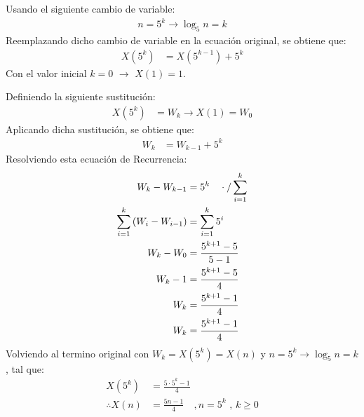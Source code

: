 \begin{solution}
Usando el siguiente cambio de variable:
\begin{align*}
    n=5^k \xrightarrow{} \log_5 n=k
\end{align*}
Reemplazando dicho cambio de variable en la ecuación original, se obtiene que:
\begin{align*}
    X(5^k) &= X(5^{k-1}) + 5^k
\end{align*}
Con el valor inicial $k=0$ $\rightarrow$ $X(1)=1$.

Definiendo la siguiente sustitución:
\begin{align*}
    X(5^k)&=W_k \rightarrow X(1)=W_0
\end{align*}
Aplicando dicha sustitución, se obtiene que:
\begin{align*}
    W_k &= W_{k-1} + 5^k
\end{align*}
Resolviendo esta ecuación de Recurrencia:
\begin{align*}
    W_k - W_{k-1} &= 5^k \quad \cdot \text{/} \sum\limits_{i=1}^{k}\\
    \sum\limits_{i=1}^{k}\left(W_i - W_{i-1} \right) &= \sum\limits_{i=1}^{k}5^i\\
    W_k - W_0 &= \frac{5^{k+1} -5}{5-1}\\
    W_k - 1 &= \frac{5^{k+1} -5}{4}\\
    W_k &= \frac{5^{k+1}-1}{4}\\
    W_k &= \frac{5^{k+1}-1}{4}
\end{align*}
Volviendo al termino original con $W_k = X(5^k) = X(n)$ y $n=5^k \rightarrow \log_5 n = k$, tal que:
\begin{align*}
    X(5^k)&=\frac{5\cdot5^k -1}{4}\\
    \therefore X(n)&=\frac{5n-1}{4} \quad, n=5^k \text{ , } k \ge 0
\end{align*}
\end{solution}